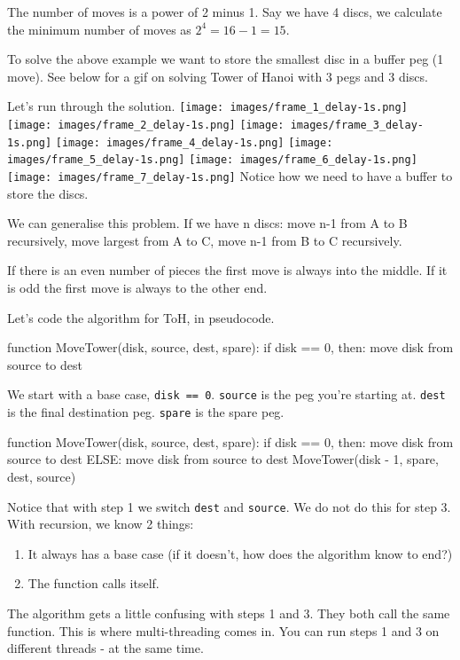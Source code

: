 \documentclass{article}
\newcommand{\code}[1]{\texttt{#1}}
\begin{document}
The number of moves is a power of 2 minus 1. Say we have 4 discs, we calculate the minimum number of moves as $2^4 = 16 - 1 = 15$. 

To solve the above example we want to store the smallest disc in a buffer peg (1 move). See below for a gif on solving Tower of Hanoi with 3 pegs and 3 discs.

Let's run through the solution.
\texttt{[image: images/frame\_1\_delay-1s.png]}
 \texttt{[image: images/frame\_2\_delay-1s.png]}
 \texttt{[image: images/frame\_3\_delay-1s.png]}
 \texttt{[image: images/frame\_4\_delay-1s.png]}
 \texttt{[image: images/frame\_5\_delay-1s.png]}
 \texttt{[image: images/frame\_6\_delay-1s.png]}
 \texttt{[image: images/frame\_7\_delay-1s.png]}
 Notice how we need to have a buffer to store the discs.
 
 We can generalise this problem. If we have n discs: move n-1 from A to B recursively, move largest from A to C, move n-1 from B to C recursively.
 
 If there is an even number of pieces the first move is always into the middle. If it is odd the first move is always to the other end.
 
 Let's  code the algorithm for ToH, in pseudocode.
 

		\begin{codebox}
\li function MoveTower(disk, source, dest, spare): \Do
    \li if disk == 0, then: \Do
    \li move disk from source to dest
    \End
\end{codebox}
We start with a base case, \code{disk == 0}. \code{source} is the peg you're starting at. \code{dest} is the final destination peg. \code{spare} is the spare peg. 
		\begin{codebox}
\li function MoveTower(disk, source, dest, spare): \Do
    \li if disk == 0, then: \Do
    \li move disk from source to dest \End
\li ELSE: \Do
\li move disk from source to dest 
\li MoveTower(disk - 1, spare, dest, source) \End
    \End
\end{codebox}
Notice that with step 1 we switch \code{dest} and \code{source}. We do not do this for step 3. 
With recursion, we know 2 things:
\begin{enumerate}
    \item It always has a base case (if it doesn't, how does the algorithm know to end?)
    \item The function calls itself.
\end{enumerate}
The algorithm gets a little confusing with steps 1 and 3. They both call the same function. This is where multi-threading comes in. You can run steps 1 and 3 on different threads - at the same time. 
\end{document}
